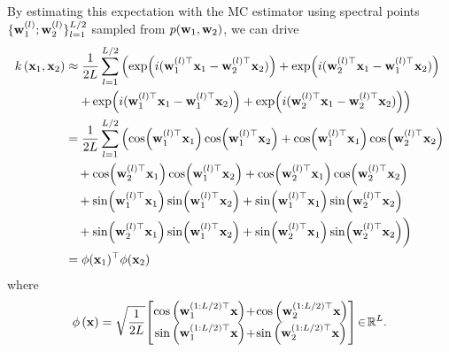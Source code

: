 By estimating this expectation with the \MakeUppercase{mc} estimator using spectral points $\{\mathbf{w}_1^{(l)}; {\mathbf w}_2^{(l)} \}_{l=1}^{L/2}$ sampled from $p({\mathbf w}_1, {\mathbf w}_2)$, we can drive 
\begin{equation}
\begin{aligned}
k\left({\mathbf x}_1, {\mathbf x}_2\right) &\approx \frac{1}{2 L} \sum_{l=1}^{L/2} \left( \exp(i({\mathbf w}_1^{(l)\top} {\mathbf x}_1 - {\mathbf w}_2^{(l)\top} {\mathbf x}_2)) + \exp(i({\mathbf w}_2^{(l)\top} {\mathbf x}_1 - {\mathbf w}_1^{(l)\top} {\mathbf x}_2)) \right. \\
& \quad \left. + \exp(i({\mathbf w}_1^{(l)\top} {\mathbf x}_1 - {\mathbf w}_1^{(l)\top} {\mathbf x}_2)) + \exp(i({\mathbf w}_2^{(l)\top} {\mathbf x}_1 - {\mathbf w}_2^{(l)\top} {\mathbf x}_2)) \right) \\
&= \frac{1}{2 L} \sum_{l=1}^{L/2} \left( \cos({\mathbf w}_{1}^{(l)\top} {\mathbf x}_1)\cos({\mathbf w}_{1}^{(l)\top} {\mathbf x}_2) + \cos({\mathbf w}_{1}^{(l)\top} {\mathbf x}_1)\cos({\mathbf w}_{2}^{(l)\top} {\mathbf x}_2) \right.\\
&\quad + \cos({\mathbf w}_{2}^{(l)\top} {\mathbf x}_1)\cos({\mathbf w}_{1}^{(l)\top} {\mathbf x}_2) + \cos({\mathbf w}_{2}^{(l)\top} {\mathbf x}_1)\cos({\mathbf w}_{2}^{(l)\top} {\mathbf x}_2) \\
&\quad + \sin({\mathbf w}_{1}^{(l)\top} {\mathbf x}_1)\sin({\mathbf w}_{1}^{(l)\top} {\mathbf x}_2) + \sin({\mathbf w}_{1}^{(l)\top} {\mathbf x}_1)\sin({\mathbf w}_{2}^{(l)\top} {\mathbf x}_2) \\
&\quad + \sin({\mathbf w}_{2}^{(l)\top} {\mathbf x}_1)\sin({\mathbf w}_{1}^{(l)\top} {\mathbf x}_2) + \sin({\mathbf w}_{2}^{(l)\top} {\mathbf x}_1)\sin({\mathbf w}_{2}^{(l)\top} {\mathbf x}_2) \bigg) \\
&= \phi({\mathbf x}_1)^{\top} \phi({\mathbf x}_2) 
\end{aligned}
\end{equation}
where 
\begin{equation}
\begin{aligned}
\phi\left({\mathbf x}\right)=\sqrt{\frac{1}{2L}}\!\begin{bmatrix}
    \cos \left( \mathbf{w}_{1}^{(1:L/2)\top}  {\mathbf x} \right)\!+\!\cos \left(  \mathbf{w}_{2}^{(1:L/2)\top} {\mathbf x}\right) \\
    \sin \left( \mathbf{w}_{1}^{(1:L/2)\top}{\mathbf x}  \right)\!+\!\sin \left(  \mathbf{w}_{2}^{(1:L/2)\top} {\mathbf x} \right)  
    \end{bmatrix}\!\in\!\mathbb{R}^{L}.
\end{aligned}
\end{equation}
